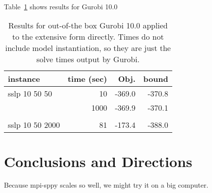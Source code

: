 \documentclass{article}
\begin{document}
Table~\ref{tab:ef} shows results for Gurobi 10.0 

\begin{center}

\begin{table}
\begin{tabular}{lrrr}
\hline\hline
instance & time (sec) &   Obj.  & bound \\
\hline
sslp 10 50 50 & 10 & -369.0 & -370.8 \\
              & 1000 & -369.9 & -370.1 \\
\\
sslp 10 50 2000 & 81 & -173.4 & -388.0 \\

\hline\hline
\end{tabular}
\caption{Results for out-of-the box Gurobi 10.0 applied to the extensive form directly. Times do not include model instantiation, so they are just the solve times output by Gurobi.\label{tab:ef}}
\end{table}
\end{center}


\section{Conclusions and Directions}

Because mpi-sppy scales so well, we might try it on a big computer.



\end{document}
